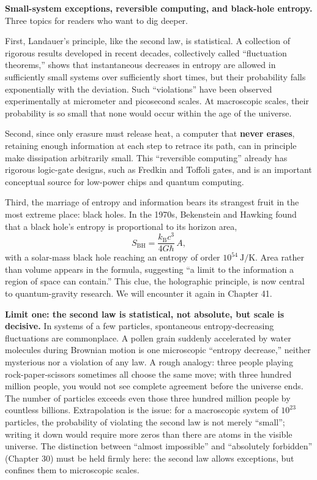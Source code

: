 \begin{challenge}
\textbf{Small-system exceptions, reversible computing, and black-hole entropy.} Three topics for readers who want to dig deeper.

First, Landauer's principle, like the second law, is statistical. A collection of rigorous results developed in recent decades, collectively called ``fluctuation theorems,'' shows that instantaneous decreases in entropy are allowed in sufficiently small systems over sufficiently short times, but their probability falls exponentially with the deviation. Such ``violations'' have been observed experimentally at micrometer and picosecond scales. At macroscopic scales, their probability is so small that none would occur within the age of the universe.

Second, since only erasure must release heat, a computer that \textbf{never erases}, retaining enough information at each step to retrace its path, can in principle make dissipation arbitrarily small. This ``reversible computing'' already has rigorous logic-gate designs, such as Fredkin and Toffoli gates, and is an important conceptual source for low-power chips and quantum computing.

Third, the marriage of entropy and information bears its strangest fruit in the most extreme place: black holes. In the 1970s, Bekenstein and Hawking found that a black hole's entropy is proportional to its horizon area,
\[
S_{\mathrm{BH}}=\frac{k_{\mathrm{B}}c^{3}}{4G\hbar}\,A,
\]
with a solar-mass black hole reaching an entropy of order $10^{54}\ \mathrm{J/K}$. Area rather than volume appears in the formula, suggesting ``a limit to the information a region of space can contain.'' This clue, the holographic principle, is now central to quantum-gravity research. We will encounter it again in Chapter 41.
\end{challenge}


\textbf{Limit one: the second law is statistical, not absolute, but scale is decisive.} In systems of a few particles, spontaneous entropy-decreasing fluctuations are commonplace. A pollen grain suddenly accelerated by water molecules during Brownian motion is one microscopic ``entropy decrease,'' neither mysterious nor a violation of any law. A rough analogy: three people playing rock-paper-scissors sometimes all choose the same move; with three hundred million people, you would not see complete agreement before the universe ends. The number of particles exceeds even those three hundred million people by countless billions. Extrapolation is the issue: for a macroscopic system of $10^{23}$ particles, the probability of violating the second law is not merely ``small''; writing it down would require more zeros than there are atoms in the visible universe. The distinction between ``almost impossible'' and ``absolutely forbidden'' (Chapter 30) must be held firmly here: the second law allows exceptions, but confines them to microscopic scales.

